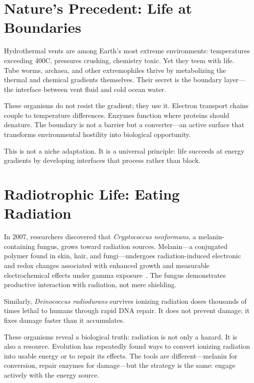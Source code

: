 \documentclass[12pt]{article}
\begin{document}
\section{Nature's Precedent: Life at Boundaries}

Hydrothermal vents are among Earth's most extreme environments: temperatures exceeding
400\textdegree C, pressures crushing, chemistry toxic. Yet they teem with life. Tube
worms, archaea, and other extremophiles thrive by metabolizing the thermal and chemical
gradients themselves. Their secret is the boundary layer---the interface between vent
fluid and cold ocean water.

These organisms do not resist the gradient; they use it. Electron transport chains couple
to temperature differences. Enzymes function where proteins should denature. The boundary
is not a barrier but a converter---an active surface that transforms environmental
hostility into biological opportunity.

This is not a niche adaptation. It is a universal principle: life succeeds at energy
gradients by developing interfaces that process rather than block.

\section{Radiotrophic Life: Eating Radiation}

In 2007, researchers discovered that \textit{Cryptococcus neoformans}, a
melanin-containing fungus, grows toward radiation sources. Melanin---a conjugated polymer
found in skin, hair, and fungi---undergoes radiation-induced electronic and redox changes
associated with enhanced growth and measurable electrochemical effects under gamma
exposure~\cite{dadachova2007,turick2011}. The fungus demonstrates productive interaction
with radiation, not mere shielding.

Similarly, \textit{Deinococcus radiodurans} survives ionizing radiation doses thousands
of times lethal to humans through rapid DNA repair. It does not prevent damage; it fixes
damage faster than it accumulates.

These organisms reveal a biological truth: radiation is not only a hazard. It is also a
resource. Evolution has repeatedly found ways to convert ionizing radiation into usable
energy or to repair its effects. The tools are different---melanin for conversion, repair
enzymes for damage---but the strategy is the same: engage actively with the energy source.
\end{document}
